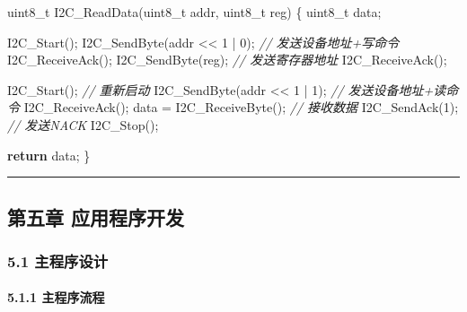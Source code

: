\documentclass[
]{article}
\newenvironment{Shaded}{}{}
\newcommand{\CommentTok}[1]{\textcolor[rgb]{0.38,0.63,0.69}{\textit{#1}}}
\newcommand{\ControlFlowTok}[1]{\textcolor[rgb]{0.00,0.44,0.13}{\textbf{#1}}}
\newcommand{\DataTypeTok}[1]{\textcolor[rgb]{0.56,0.13,0.00}{#1}}
\newcommand{\DecValTok}[1]{\textcolor[rgb]{0.25,0.63,0.44}{#1}}
\newcommand{\NormalTok}[1]{#1}
\begin{document}
\begin{Shaded}
\begin{Highlighting}[]
\DataTypeTok{uint8\_t}\NormalTok{ I2C\_ReadData(}\DataTypeTok{uint8\_t}\NormalTok{ addr, }\DataTypeTok{uint8\_t}\NormalTok{ reg)}
\NormalTok{\{}
    \DataTypeTok{uint8\_t}\NormalTok{ data;}
    
\NormalTok{    I2C\_Start();}
\NormalTok{    I2C\_SendByte(addr \textless{}\textless{} }\DecValTok{1}\NormalTok{ | }\DecValTok{0}\NormalTok{);  }\CommentTok{// 发送设备地址+写命令}
\NormalTok{    I2C\_ReceiveAck();}
\NormalTok{    I2C\_SendByte(reg);             }\CommentTok{// 发送寄存器地址}
\NormalTok{    I2C\_ReceiveAck();}
    
\NormalTok{    I2C\_Start();                   }\CommentTok{// 重新启动}
\NormalTok{    I2C\_SendByte(addr \textless{}\textless{} }\DecValTok{1}\NormalTok{ | }\DecValTok{1}\NormalTok{);  }\CommentTok{// 发送设备地址+读命令}
\NormalTok{    I2C\_ReceiveAck();}
\NormalTok{    data = I2C\_ReceiveByte();      }\CommentTok{// 接收数据}
\NormalTok{    I2C\_SendAck(}\DecValTok{1}\NormalTok{);                }\CommentTok{// 发送NACK}
\NormalTok{    I2C\_Stop();}
    
    \ControlFlowTok{return}\NormalTok{ data;}
\NormalTok{\}}
\end{Highlighting}
\end{Shaded}

\begin{center}\rule{0.5\linewidth}{0.5pt}\end{center}

\hypertarget{ux7b2cux4e94ux7ae0-ux5e94ux7528ux7a0bux5e8fux5f00ux53d1}{%
\subsection{第五章
应用程序开发}\label{ux7b2cux4e94ux7ae0-ux5e94ux7528ux7a0bux5e8fux5f00ux53d1}}

\hypertarget{ux4e3bux7a0bux5e8fux8bbeux8ba1}{%
\subsubsection{5.1 主程序设计}\label{ux4e3bux7a0bux5e8fux8bbeux8ba1}}

\hypertarget{ux4e3bux7a0bux5e8fux6d41ux7a0b}{%
\paragraph{5.1.1 主程序流程}\label{ux4e3bux7a0bux5e8fux6d41ux7a0b}}
\end{document}
